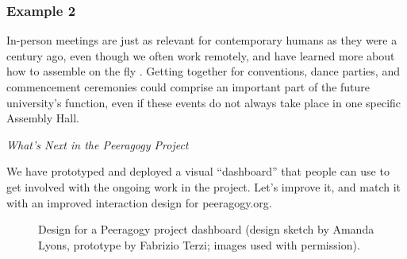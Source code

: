 
\subsubsection*{Example 2} In-person meetings are just as
relevant for contemporary humans as they were a century ago, even though we
often work remotely, and have learned more about how to assemble on the fly
\cite{rheingold2007smart}.  Getting together for conventions, dance
parties, and commencement ceremonies could comprise an important part
of the future university's  function, even if
these events do not always take place in one specific Assembly Hall.



\begin{framed}
\noindent 
\emph{What's Next in the Peeragogy Project}
\begin{collectinmacro}{\WrapperWN}{}{}
We have prototyped and deployed a visual ``dashboard'' that people can use to get involved with the ongoing work in the project.  Let's improve it, and match it with an improved interaction design for peeragogy.org.
\end{collectinmacro}
\WrapperWN
\end{framed}    

\begin{figure}[t]
{\centering
{}

\par}
\caption{Design for a Peeragogy project dashboard (design sketch by Amanda Lyons, prototype by Fabrizio Terzi; images used with permission).\label{dashboard}}
\end{figure}



\newpage
